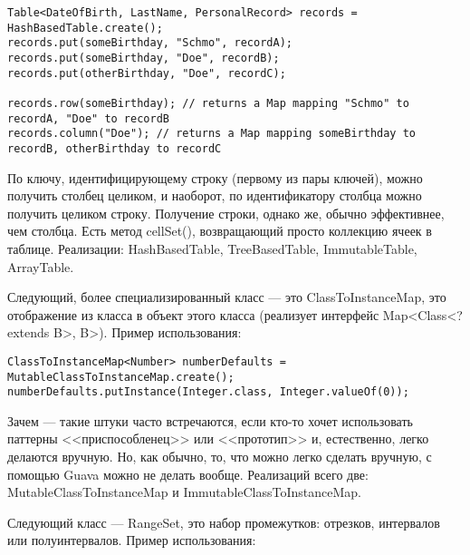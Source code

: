 \documentclass[a5paper,draft]{article}
\begin{document}
\begin{verbatim}
Table<DateOfBirth, LastName, PersonalRecord> records = HashBasedTable.create();
records.put(someBirthday, "Schmo", recordA);
records.put(someBirthday, "Doe", recordB);
records.put(otherBirthday, "Doe", recordC);

records.row(someBirthday); // returns a Map mapping "Schmo" to recordA, "Doe" to recordB
records.column("Doe"); // returns a Map mapping someBirthday to recordB, otherBirthday to recordC
\end{verbatim}

По ключу, идентифицирующему строку (первому из пары ключей), можно получить столбец целиком, и наоборот, по идентификатору столбца можно получить целиком строку. Получение строки, однако же, обычно эффективнее, чем столбца. Есть метод cellSet(), возвращающий просто коллекцию ячеек в таблице. Реализации: HashBasedTable, TreeBasedTable, ImmutableTable, ArrayTable.

Следующий, более специализированный класс --- это ClassToInstanceMap, это отображение из класса в объект этого класса (реализует интерфейс Map<Class<? extends B>, B>). Пример использования:

\begin{verbatim}
ClassToInstanceMap<Number> numberDefaults = MutableClassToInstanceMap.create();
numberDefaults.putInstance(Integer.class, Integer.valueOf(0));
\end{verbatim}

Зачем --- такие штуки часто встречаются, если кто-то хочет использовать паттерны <<приспособленец>> или <<прототип>> и, естественно, легко делаются вручную. Но, как обычно, то, что можно легко сделать вручную, с помощью Guava можно не делать вообще. Реализаций всего две: MutableClassToInstanceMap и ImmutableClassToInstanceMap.

Следующий класс --- RangeSet, это набор промежутков: отрезков, интервалов или полуинтервалов. Пример использования:
\end{document}

